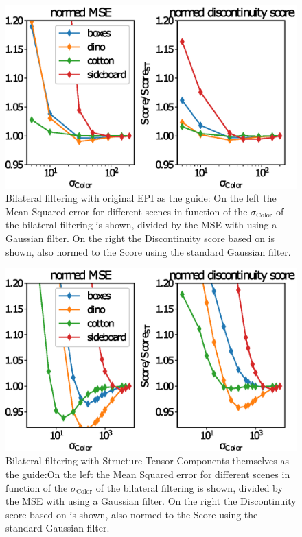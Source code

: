 \documentclass  [
  paper    = a4,
  BCOR     = 10mm,
  twoside,
  fontsize = 12pt,
  fleqn,
  toc      = bibnumbered,
  toc      = listofnumbered,
  numbers  = noendperiod,
  headings = normal,
  listof   = leveldown,
  version  = 3.03
]                                       {scrreprt}
\begin{document}
\begin{figure}
	\centering
	\includegraphics[width=0.7\linewidth]{images/bilateral_params}
	\caption[Parameter dependency for bilateral filtering using EPI]{Bilateral filtering with original EPI as the guide: On the left the Mean Squared error for different scenes in function of the $\sigma_\text{Color}$ of the bilateral filtering is shown, divided by the MSE with using a Gaussian filter. On the right the Discontinuity score based on \cite{honauer2016benchmark} is shown, also normed to the Score using the standard Gaussian filter.}
	\label{fig:bilateralparams}
\end{figure}
\begin{figure}
	\centering
	\includegraphics[width=0.7\linewidth]{images/bilateral_norm_params}
	\caption[Parameter dependency for bilateral filtering]{Bilateral filtering with Structure Tensor Components themselves as the guide:On the left the Mean Squared error for different scenes in function of the $\sigma_\text{Color}$ of the bilateral filtering is shown, divided by the MSE with using a Gaussian filter. On the right the Discontinuity score based on \cite{honauer2016benchmark} is shown, also normed to the Score using the standard Gaussian filter.}
	\label{fig:bilateralnormparams}
\end{figure}
\end{document}
